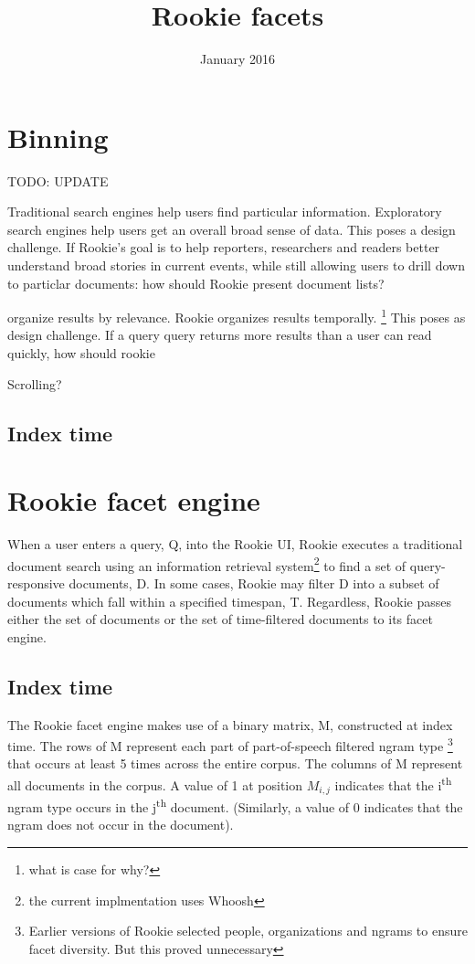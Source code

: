 \documentclass{article}
\title{Rookie facets}
\author{}
\date{January 2016}
\begin{document}
\maketitle

\section{Binning}

TODO: UPDATE

Traditional search engines help users find particular information. Exploratory search engines help users get an overall broad sense of data. This poses a design challenge. If Rookie's goal is to help reporters, researchers and readers better understand broad stories in current events, while still allowing users to drill down to particlar documents: how should Rookie present document lists?

organize results by relevance. Rookie organizes results temporally. \footnote{what is case for why?} This poses as design challenge. If a query query returns more results than a user can read quickly, how should rookie 

Scrolling?


\subsection{Index time}



\section{Rookie facet engine}

When a user enters a query, Q, into the Rookie UI, Rookie executes a traditional document search using an information retrieval system\footnote {the current implmentation uses Whoosh} to find a set of query-responsive documents, D. In some cases, Rookie may filter D into a subset of documents which fall within a specified timespan, T. Regardless, Rookie passes either the set of documents or the set of time-filtered documents to its facet engine.

\subsection{Index time}

The Rookie facet engine makes use of a binary matrix, M, constructed at index time. The rows of M represent each part of part-of-speech filtered ngram type \footnote{Earlier versions of Rookie selected people, organizations and ngrams to ensure facet diversity. But this proved unnecessary} that occurs at least 5 times across the entire corpus. The columns of M represent all documents in the corpus. A value of 1 at position $M_{i,j}$ indicates that the i\textsuperscript{th} ngram type occurs in the j\textsuperscript{th} document. (Similarly, a value of 0 indicates that the ngram does not occur in the document).
\end{document}
